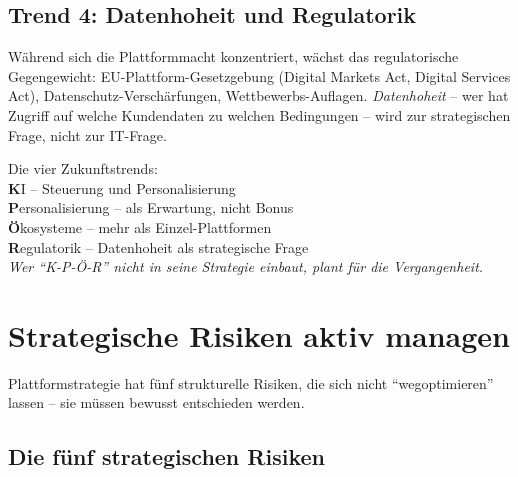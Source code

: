 \documentclass[11pt,a4paper,oneside]{article}
\newcommand{\caveatfontfallback}{\itshape}
\newcommand\caveatfont{\caveatfontfallback}%
\newcommand{\akzent}[1]{{\caveatfont\color{lpAmber}#1}}
\begin{document}
\subsection{Trend 4: Datenhoheit und Regulatorik}

Während sich die Plattformmacht konzentriert, wächst das regulatorische Gegengewicht: EU-Plattform-Gesetzgebung (Digital Markets Act, Digital Services Act), Datenschutz-Verschärfungen, Wettbewerbs-Auflagen. \emph{Datenhoheit} -- wer hat Zugriff auf welche Kundendaten zu welchen Bedingungen -- wird zur strategischen Frage, nicht zur IT-Frage.

\begin{eselsbox}[Eselsbrücke: \akzent{K-P-Ö-R}]
Die vier Zukunftstrends:\\[2pt]
\textbf{K}I -- Steuerung und Personalisierung\\
\textbf{P}ersonalisierung -- als Erwartung, nicht Bonus\\
\textbf{Ö}kosysteme -- mehr als Einzel-Plattformen\\
\textbf{R}egulatorik -- Datenhoheit als strategische Frage\\[2pt]
\emph{Wer ``K-P-Ö-R'' nicht in seine Strategie einbaut, plant für die Vergangenheit.}
\end{eselsbox}

\section{Strategische Risiken aktiv managen}

Plattform­strategie hat fünf strukturelle Risiken, die sich nicht ``wegoptimieren'' lassen -- sie müssen bewusst entschieden werden.

\subsection{Die fünf strategischen Risiken}
\end{document}
